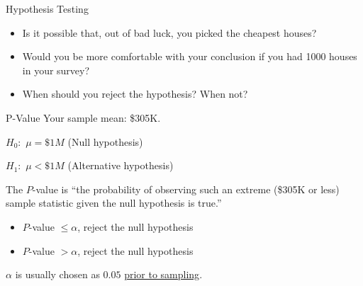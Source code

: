 \documentclass{beamer}\usepackage[]{graphicx}\usepackage[]{color}
\begin{document}
\begin{darkframes}
\begin{frame}[label=lists]{Hypothesis Testing}
\begin{itemize}
   \item Is it possible that, out of bad luck, you picked the cheapest houses? \pause
    
   \item Would you be more comfortable with your conclusion if you had 1000 houses in your survey? \pause
    
   \item When should you reject the hypothesis? When not?
    
   \end{itemize}


	\end{frame}
	
	
	\begin{frame}[label=lists]{P-Value}
		Your sample mean: \$305K. 	\newline \pause
	
		$H_0:$ $\mu=\$1M$	(Null hypothesis)
		
		$H_1:$ $\mu<\$1M$	(Alternative hypothesis) \newline \pause
		
		
		
		The \alert{$P$-value} is ``the probability of observing such an extreme (\$305K or less) sample statistic given the null hypothesis is true.'' \newline \pause
		
		\begin{itemize}
		\item $P$-value  $\leq \alpha$, reject the null hypothesis \pause
		\item $P$-value  $> \alpha$, reject the null hypothesis \pause
		
		\end{itemize}		
		
		
		$\alpha$ is usually chosen as $0.05$ \underline{prior to sampling}.		
		

	\end{frame}
	

\end{darkframes}
\end{document}
